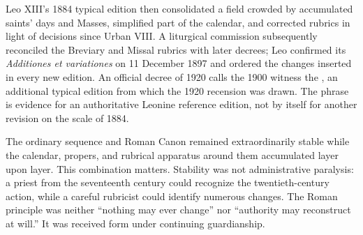 Leo XIII's 1884 typical edition then consolidated a field crowded by accumulated saints' days and Masses, simplified part of the calendar, and corrected rubrics in light of decisions since Urban VIII. A liturgical commission subsequently reconciled the Breviary and Missal rubrics with later decrees; Leo confirmed its \emph{Additiones et variationes} on 11 December 1897 and ordered the changes inserted in every new edition. An official decree of 1920 calls the 1900 witness the , an additional typical edition from which the 1920 recension was drawn. The phrase is evidence for an authoritative Leonine reference edition, not by itself for another revision on the scale of 1884.

The ordinary sequence and Roman Canon remained extraordinarily stable while the calendar, propers, and rubrical apparatus around them accumulated layer upon layer. This combination matters. Stability was not administrative paralysis: a priest from the seventeenth century could recognize the twentieth-century action, while a careful rubricist could identify numerous changes. The Roman principle was neither “nothing may ever change” nor “authority may reconstruct at will.” It was received form under continuing guardianship.

